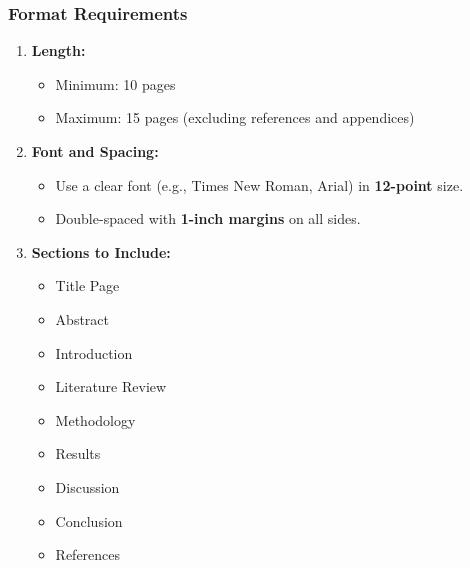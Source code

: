 \documentclass[aspectratio=169]{beamer}
\begin{document}
\begin{frame}[fragile]
    \frametitle{Format Requirements}
    \begin{enumerate}
        \item \textbf{Length:}
            \begin{itemize}
                \item Minimum: 10 pages
                \item Maximum: 15 pages (excluding references and appendices)
            \end{itemize}
        \item \textbf{Font and Spacing:}
            \begin{itemize}
                \item Use a clear font (e.g., Times New Roman, Arial) in \textbf{12-point} size.
                \item Double-spaced with \textbf{1-inch margins} on all sides.
            \end{itemize}
        \item \textbf{Sections to Include:}
            \begin{itemize}
                \item Title Page
                \item Abstract
                \item Introduction
                \item Literature Review
                \item Methodology
                \item Results
                \item Discussion
                \item Conclusion
                \item References
            \end{itemize}
    \end{enumerate}
\end{frame}
\end{document}
